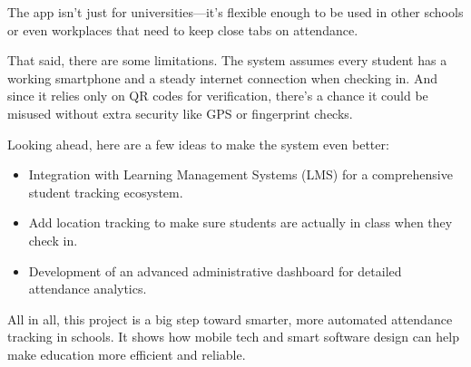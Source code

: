 \documentclass[12pt,a4paper]{report}
\begin{document}
The app isn't just for universities—it's flexible enough to be used in other schools or even workplaces that need to keep close tabs on attendance.

That said, there are some limitations. The system assumes every student has a working smartphone and a steady internet connection when checking in. And since it relies only on QR codes for verification, there's a chance it could be misused without extra security like GPS or fingerprint checks.

Looking ahead, here are a few ideas to make the system even better:
\begin{itemize}
  \item Integration with Learning Management Systems (LMS) for a comprehensive student tracking ecosystem.
  \item Add location tracking to make sure students are actually in class when they check in.
  \item Development of an advanced administrative dashboard for detailed attendance analytics.
\end{itemize}

All in all, this project is a big step toward smarter, more automated attendance tracking in schools. It shows how mobile tech and smart software design can help make education more efficient and reliable.




% 
% 
% 
% 
% 
% 
\end{document}
